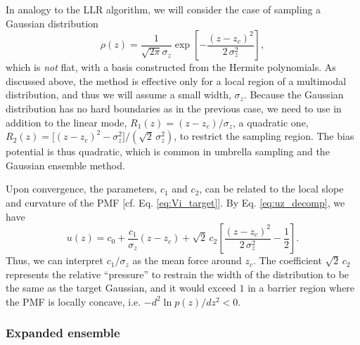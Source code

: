 \documentclass[reprint, superscriptaddress, floatfix]{revtex4-1}
\begin{document}
In analogy to the LLR algorithm,
we will consider the case of sampling
a Gaussian distribution
\begin{equation}
  \rho(z)
  =
  \frac{1}{\sqrt{2\pi} \sigma_z}
  \exp\left[ - \frac{(z-z_c)^2}{2\,\sigma_z^2} \right]
  ,
  \label{eq:rho_Gaussian}
\end{equation}
which is \emph{not} flat,
with a basis constructed from
the Hermite polynomials\cite{arfken}.
%
As discussed above,
the method is effective only for
a local region of a multimodal distribution,
and thus we will assume a small width, $\sigma_z$.
%
Because the Gaussian distribution has no hard boundaries
as in the previous case,
we need to use
in addition to the linear mode,
$R_1(z) = (z - z_c)/\sigma_z$,
a quadratic one,
$R_2(z) = \bigl[(z - z_c)^2 - \sigma_z^2\bigr] /\left(\sqrt 2 \, \sigma_z^2\right)$,
to restrict the sampling region.
%
The bias potential is thus
quadratic\cite{maragliano2006, *abrams2008, zhu2012, neuhaus2006, *neuhaus2007},
which is common in umbrella sampling\cite{torrie1974, *torrie1977}
and the Gaussian ensemble method\cite{hetherington1987,
*challa1988, *costeniuc2006}.

Upon convergence,
the parameters, $c_1$ and $c_2$,
can be related to the local slope and curvature of the PMF
[cf. Eq. \eqref{eq:Vi_target}].
%
By Eq. \eqref{eq:uz_decomp}, we have
\begin{equation}
  u(z) = c_0 + \frac{c_1}{\sigma_z} (z - z_c)
  + \sqrt 2 \, c_2 \left[ \frac{(z-z_c)^2}{2 \, \sigma_z^2} - \frac{1}{2} \right]
  .
  \label{eq:u_age}
\end{equation}
Thus, we can interpret
$c_1/\sigma_z$ as the mean force around $z_c$.
%
The coefficient
$\sqrt{2} \, c_2$ represents the relative ``pressure''
to restrain the width of the distribution to
be the same as the target Gaussian,
and it would exceed $1$ in a barrier region
where the PMF is locally concave,
i.e. $-d^2\ln p(z)/dz^2 < 0$.



\subsubsection{\label{sec:st}
Expanded ensemble}
\end{document}
